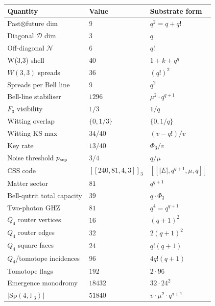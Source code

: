 \documentclass[11pt]{article}
\newcommand{\Sp}{\mathrm{Sp}}
\newcommand{\GF}[1]{\mathbb{F}_{#1}}
\begin{document}
\begin{center}\small\begin{tabular}{lll}
\toprule
\textbf{Quantity} & \textbf{Value} & \textbf{Substrate form} \\
\midrule
Past$\otimes$future dim    & $9$    & $q^2 = q + q!$ \\
Diagonal $\mathcal D$ dim   & $3$    & $q$ \\
Off-diagonal $\mathcal N$  & $6$    & $q!$ \\
W(3,3) shell               & $40$   & $1 + k + q^q$ \\
$W(3,3)$ spreads            & $36$   & $(q!)^2$ \\
Spreads per Bell line       & $9$    & $q^2$ \\
Bell-line stabiliser        & $1296$ & $\mu^2 \cdot q^{q+1}$ \\
$F_3$ visibility            & $1/3$  & $1/q$ \\
Witting overlap            & $\{0, 1/3\}$ & $\{0, 1/q\}$ \\
Witting KS max             & $34/40$ & $(v - q!)/v$ \\
Key rate                   & $13/40$ & $\Phi_3/v$ \\
Noise threshold $p_{\rm sep}$ & $3/4$ & $q/\mu$ \\
CSS code                   & $[[240,81,4,3]]_3$ & $[[|E|, q^{q+1}, \mu, q]]$ \\
Matter sector               & $81$    & $q^{q+1}$ \\
Bell-qutrit total capacity  & $39$    & $q\cdot\Phi_3$ \\
Two-photon GHZ              & $81$    & $q^4 = q^{q+1}$ \\
$Q_4$ router vertices       & $16$    & $(q+1)^2$ \\
$Q_4$ router edges          & $32$    & $2(q+1)^2$ \\
$Q_4$ square faces          & $24$    & $q!(q+1)$ \\
$Q_4$/tomotope incidences   & $96$    & $4q!(q+1)$ \\
Tomotope flags              & $192$   & $2\cdot96$ \\
Emergence monodromy         & $18432$ & $32\cdot24^2$ \\
$|\Sp(4,\GF{3})|$           & $51840$ & $v\cdot\mu^2\cdot q^{q+1}$ \\
\bottomrule
\end{tabular}\end{center}
\end{document}
